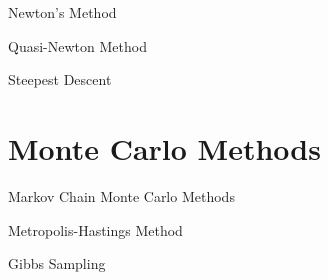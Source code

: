 \documentclass[11pt,a4paper]{article}
\begin{document}
\begin{definition}{Newton's Method}

\end{definition}

\begin{definition}{Quasi-Newton Method}

\end{definition}

\begin{definition}{Steepest Descent}

\end{definition}

\section{Monte Carlo Methods}

\begin{definition}{Markov Chain Monte Carlo Methods}
\end{definition}

\begin{definition}{Metropolis-Hastings Method}

\end{definition}

\begin{definition}{Gibbs Sampling}
\end{definition}
\end{document}
